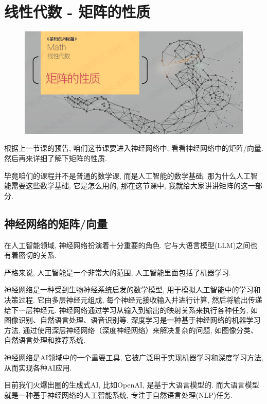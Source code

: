 \chapter{线性代数 - 矩阵的性质 }

\begin{figure}[ht]
  \centering
  \includegraphics[width=1\linewidth]{asset/20230909164246.png}
\end{figure}

\newpage

根据上一节课的预告, 咱们这节课要进入神经网络中, 看看神经网络中的矩阵/向量. 然后再来详细了解下矩阵的性质. 

毕竟咱们的课程并不是普通的数学课, 而是人工智能的数学基础. 那为什么人工智能需要这些数学基础, 它是怎么用的, 那在这节课中, 我就给大家讲讲矩阵的这一部分. 

\section{神经网络的矩阵/向量}

在人工智能领域, 神经网络扮演着十分重要的角色. 它与大语言模型(LLM)之间也有着密切的关系. 

严格来说, 人工智能是一个非常大的范围, 人工智能里面包括了机器学习. 

神经网络是一种受到生物神经系统启发的数学模型, 用于模拟人工智能中的学习和决策过程. 它由多层神经元组成, 每个神经元接收输入并进行计算, 然后将输出传递给下一层神经元. 神经网络通过学习从输入到输出的映射关系来执行各种任务, 如图像识别、自然语言处理、语音识别等. 深度学习是一种基于神经网络的机器学习方法, 通过使用深层神经网络（深度神经网络）来解决复杂的问题, 如图像分类、自然语言处理和推荐系统. 

神经网络是AI领域中的一个重要工具, 它被广泛用于实现机器学习和深度学习方法, 从而实现各种AI应用. 

目前我们火爆出圈的生成式AI, 比如OpenAI, 是基于大语言模型的. 而大语言模型就是一种基于神经网络的人工智能系统, 专注于自然语言处理(NLP)任务. 

